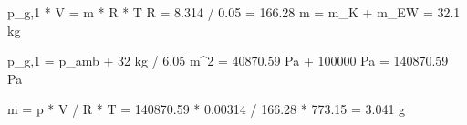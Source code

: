 p_g,1 * V = m * R * T  
R = 8.314 / 0.05 = 166.28  
m = m_K + m_EW = 32.1 kg  

p_g,1 = p_amb + 32 kg / 6.05 m^2 = 40870.59 Pa + 100000 Pa = 140870.59 Pa  

m = p * V / R * T = 140870.59 * 0.00314 / 166.28 * 773.15 = 3.041 g
